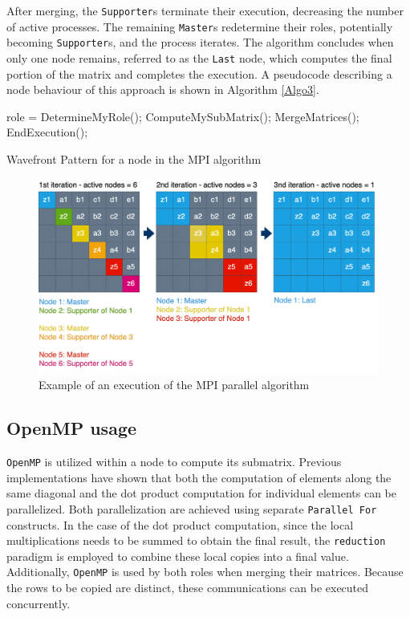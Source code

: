 After merging, the \texttt{Supporter}s terminate their execution, decreasing the number of active processes. The remaining \texttt{Master}s redetermine their roles, potentially becoming \texttt{Supporter}s, and the process iterates. The algorithm concludes when only one node remains, referred to as the \texttt{Last} node, which computes the final portion of the matrix and completes the execution. A pseudocode describing a node behaviour of this approach is shown in Algorithm \ref{Algo3}.

\begin{algorithm}
\begin{algorithmic}
    \STATE role = DetermineMyRole();
    \STATE ComputeMySubMatrix();
        \STATE MergeMatrices();
    \ENDIF
        \STATE EndExecution();
    \ENDIF
\ENDWHILE
\end{algorithmic}
\caption{Wavefront Pattern for a node in the MPI algorithm}
\label{Algo3}
\end{algorithm}


\begin{figure}[h]
    \centering\includegraphics[scale=0.30]{img/MPI/DivideEtImpera.drawio.png}
    
    \caption{Example of an execution of the MPI parallel algorithm}
\end{figure}


\subsection*{OpenMP usage}
\texttt{OpenMP} is utilized within a node to compute its submatrix. Previous implementations have shown that both the computation of elements along the same diagonal and the dot product computation for individual elements can be parallelized. Both parallelization are achieved using separate \texttt{Parallel For} constructs. In the case of the dot product computation, since the local multiplications needs to be summed to obtain the final result, the \texttt{reduction} paradigm is employed to combine these local copies into a final value. Additionally, \texttt{OpenMP} is used by both roles when merging their matrices. Because the rows to be copied are distinct, these communications can be executed concurrently.

